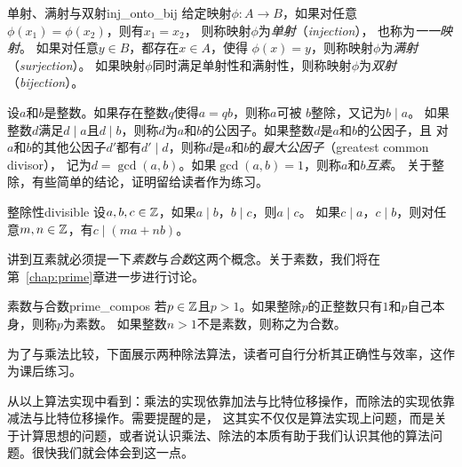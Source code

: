 \begin{definition}{单射、满射与双射}{inj_onto_bij}
给定映射$\phi\colon A \to B$，如果对任意$\phi(x_1) = \phi(x_2)$，则有$x_1 = x_2$，
则称映射$\phi$为\emph{单射}（\emph{injection}），
也称为\emph{一一映射}。
如果对任意$y \in B$，都存在$x \in A$，使得
$\phi(x) = y$，则称映射$\phi$为\emph{满射}（\emph{surjection}）。
如果映射$\phi$同时满足单射性和满射性，则称映射$\phi$为\emph{双射}（\emph{bijection}）。
\end{definition}

设$a$和$b$是整数。如果存在整数$q$使得$a = qb$，则称$a$可被 $b$整除，又记为$b \mid a$。
如果整数$d$满足$d \mid a$且$d \mid b$，则称$d$为$a$和$b$的公因子。如果整数$d$是$a$和$b$的公因子，且
对$a$和$b$的其他公因子$d'$都有$d' \mid d$，则称$d$是$a$和$b$的\emph{最大公因子}（greatest common divisor），
记为$d=\gcd(a, b)$。如果$\gcd(a, b) = 1$，则称$a$和$b$\emph{互素}。
关于整除，有些简单的结论，证明留给读者作为练习。
\begin{proposition}{整除性}{divisible}
设$a,b,c \in {\mathbb Z}$，如果$a \mid b$，$b \mid c$，则$a \mid c$。
如果$c \mid a$，$c \mid b$，则对任意$m, n \in {\mathbb Z}$，有$c \mid (ma + nb)$。
\end{proposition}

讲到互素就必须提一下\emph{素数}与\emph{合数}这两个概念。关于素数，我们将在第~\ref{chap:prime}章进一步进行讨论。
\begin{definition}{素数与合数}{prime_compos}
若$p \in {\mathbb Z}$且$p > 1$。如果整除$p$的正整数只有$1$和$p$自己本身，则称$p$为素数。
如果整数$n > 1$不是素数，则称之为合数。
\end{definition}

为了与乘法比较，下面展示两种除法算法，读者可自行分析其正确性与效率，这作为课后练习。
\begin{center}
	
\end{center}

\begin{center}
	
\end{center}

从以上算法实现中看到：乘法的实现依靠加法与比特位移操作，而除法的实现依靠减法与比特位移操作。需要提醒的是，
这其实不仅仅是算法实现上问题，而是关于计算思想的问题，或者说认识乘法、除法的本质有助于我们认识其他的算法问题。很快我们就会体会到这一点。

